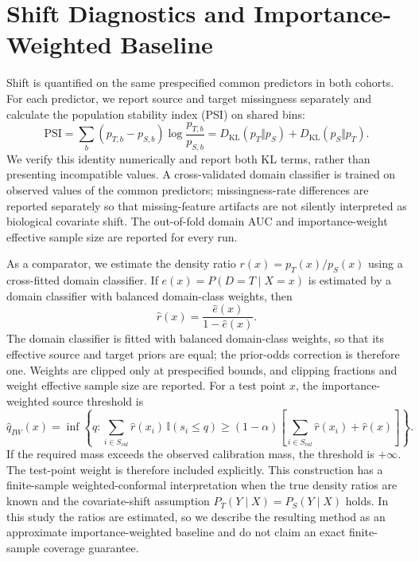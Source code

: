\section{Shift Diagnostics and Importance-Weighted Baseline}
\label{sec:shift_diagnostics}

Shift is quantified on the same prespecified common predictors in both cohorts.
For each predictor, we report source and target missingness separately and
calculate the population stability index (PSI) on shared bins:
\begin{equation}
  \mathrm{PSI}=\sum_b (p_{T,b}-p_{S,b})\log\frac{p_{T,b}}{p_{S,b}}
  =D_{\mathrm{KL}}(p_T\Vert p_S)+D_{\mathrm{KL}}(p_S\Vert p_T).
\end{equation}
We verify this identity numerically and report both KL terms, rather than
presenting incompatible values. A cross-validated domain classifier is trained
on observed values of the common predictors; missingness-rate differences are
reported separately so that missing-feature artifacts are not silently
interpreted as biological covariate shift. The out-of-fold domain AUC and
importance-weight effective sample size are reported for every run.

As a comparator, we estimate the density ratio
$r(x)=p_T(x)/p_S(x)$ using a cross-fitted domain classifier. If
$e(x)=P(D=T\mid X=x)$ is estimated by a domain classifier with balanced
domain-class weights, then
\begin{equation}
 \widehat r(x)=\frac{\widehat e(x)}{1-\widehat e(x)}.
\end{equation}
The domain classifier is fitted with balanced domain-class weights, so that its
effective source and target priors are equal; the prior-odds correction is
therefore one.
Weights are clipped only at prespecified bounds, and clipping fractions and
weight effective sample size are reported. For a test point $x$, the
importance-weighted source threshold is
\begin{equation}
 \widehat q_{IW}(x)=\inf\left\{q:
 \sum_{i\in S_{cal}}\widehat r(x_i)\,\mathbb{I}(s_i\le q)
 \ge (1-\alpha)\left[\sum_{i\in S_{cal}}\widehat r(x_i)+\widehat r(x)\right]
 \right\}.
\end{equation}
If the required mass exceeds the observed calibration mass, the threshold is
$+\infty$. The test-point weight is therefore included explicitly. This
construction has a finite-sample weighted-conformal interpretation when the
true density ratios are known and the covariate-shift assumption
$P_T(Y\mid X)=P_S(Y\mid X)$ holds. In this study the ratios are estimated, so
we describe the resulting method as an approximate importance-weighted
baseline and do not claim an exact finite-sample coverage guarantee.

